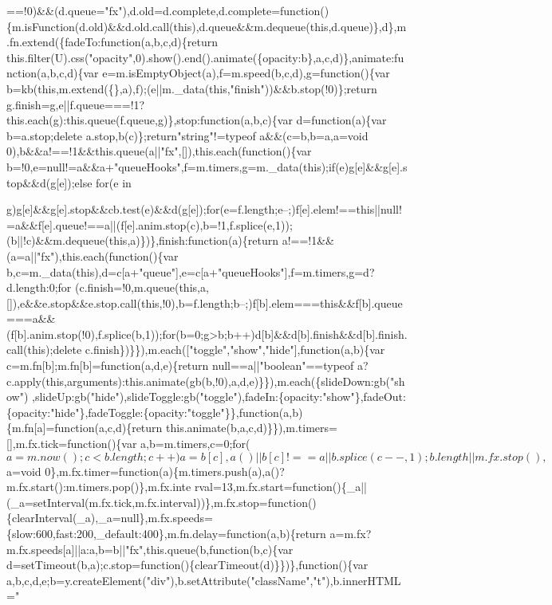 \begin{DoxyCode}
{      ==!0)&&(d.queue="fx"),d.old=d.complete,d.complete=function()\{m.isFunction(d.old)&&d.old.call(this),d.queue&&m.dequeue(this,d.queue)\},d\},m.fn.extend(\{fadeTo:function(a,b,c,d)\{return
       this.filter(U).css("opacity",0).show().end().animate(\{opacity:b\},a,c,d)\},animate:function(a,b,c,d)\{var
       e=m.isEmptyObject(a),f=m.speed(b,c,d),g=function()\{var b=kb(this,m.extend(\{\},a),f);(e||m.\_data(this,"finish"))&&b.stop(!0)\};return
       g.finish=g,e||f.queue===!1?this.each(g):this.queue(f.queue,g)\},stop:function(a,b,c)\{var d=function(a)\{var b=a.stop;delete
       a.stop,b(c)\};return"string"!=typeof a&&(c=b,b=a,a=void
       0),b&&a!==!1&&this.queue(a||"fx",[]),this.each(function()\{var b=!0,e=null!=a&&a+"queueHooks",f=m.timers,g=m.\_data(this);if(e)g[e]&&g[e].stop&&d(g[e]);else for(e in
       
      g)g[e]&&g[e].stop&&cb.test(e)&&d(g[e]);for(e=f.length;e--;)f[e].elem!==this||null!=a&&f[e].queue!==a||(f[e].anim.stop(c),b=!1,f.splice(e,1));(b||!c)&&m.dequeue(this,a)\})\},finish:function(a)\{return
       a!==!1&&(a=a||"fx"),this.each(function()\{var
       b,c=m.\_data(this),d=c[a+"queue"],e=c[a+"queueHooks"],f=m.timers,g=d?d.length:0;for
      (c.finish=!0,m.queue(this,a,[]),e&&e.stop&&e.stop.call(this,!0),b=f.length;b--;)f[b].elem===this&&f[b].queue===a&&(f[b].anim.stop(!0),f.splice(b,1));for(b=0;g>b;b++)d[b]&&d[b].finish&&d[b].finish.call(this);delete
       c.finish\})\}\}),m.each(["toggle","show","hide"],function(a,b)\{var c=m.fn[b];m.fn[b]=function(a,d,e)\{return
       null==a||"boolean"==typeof
       a?c.apply(this,arguments):this.animate(gb(b,!0),a,d,e)\}\}),m.each(\{slideDown:gb("show")
      ,slideUp:gb("hide"),slideToggle:gb("toggle"),fadeIn:\{opacity:"show"\},fadeOut:\{opacity:"hide"\},fadeToggle:\{opacity:"toggle"\}\},function(a,b)\{m.fn[a]=function(a,c,d)\{return
       this.animate(b,a,c,d)\}\}),m.timers=[],m.fx.tick=function()\{var
       a,b=m.timers,c=0;for($a=m.now();c<b.length;c++)a=b[c],a()||b[c]!==a||b.splice(c--,1);b.length||m.fx.stop(),$a=void
       0\},m.fx.timer=function(a)\{m.timers.push(a),a()?m.fx.start():m.timers.pop()\},m.fx.inte
      rval=13,m.fx.start=function()\{\_a||(\_a=setInterval(m.fx.tick,m.fx.interval))\},m.fx.stop=function()\{clearInterval(\_a),\_a=null\},m.fx.speeds=\{slow:600,fast:200,\_default:400\},m.fn.delay=function(a,b)\{return
       a=m.fx?m.fx.speeds[a]||a:a,b=b||"fx",this.queue(b,function(b,c)\{var
       d=setTimeout(b,a);c.stop=function()\{clearTimeout(d)\}\})\},function()\{var a,b,c,d,e;b=y.createElement("div"),b.setAttribute("className","t"),b.innerHTML=" 
}
\end{DoxyCode}
